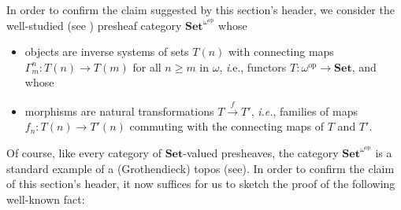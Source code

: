 \documentclass[12pt]{amsart}
\theoremstyle{definition}
\newcommand{\Sets}{\mathbf{Set}}
\newcommand{\SetNop}{\Sets^{\omega^{\op}}}
\newcommand{\op}{\mathrm{op}}
\begin{document}
In order to confirm the claim suggested by this section's header, we consider the well-studied (see \cite{Birkedal2012}) presheaf category $\SetNop$ whose
\begin{itemize}
	\item objects are inverse systems of sets $T(n)$ with connecting maps $\Gamma^n_m: T(n)\to T(m)$ for all $n\geq m$ in $\omega$, {\textit  i.e.}, functors $T\colon \omega^{\op} \to \Sets$, 
	and whose
	\item morphisms 
	are natural transformations $T\stackrel{f}{\to}T'$, \textit{i.e.}, families of maps $f_n\colon T(n)\to T'(n)$ commuting with the connecting maps of $T$ and $T'$. 
\end{itemize}
Of course, like every category of $\Sets$-valued presheaves, the category $\SetNop$ is a standard example of a  (Grothendieck) topos (see\cite{MacLane1992}). In order to confirm the claim of this section's header, it now suffices for us to sketch the proof of the following well-known fact:
\end{document}

